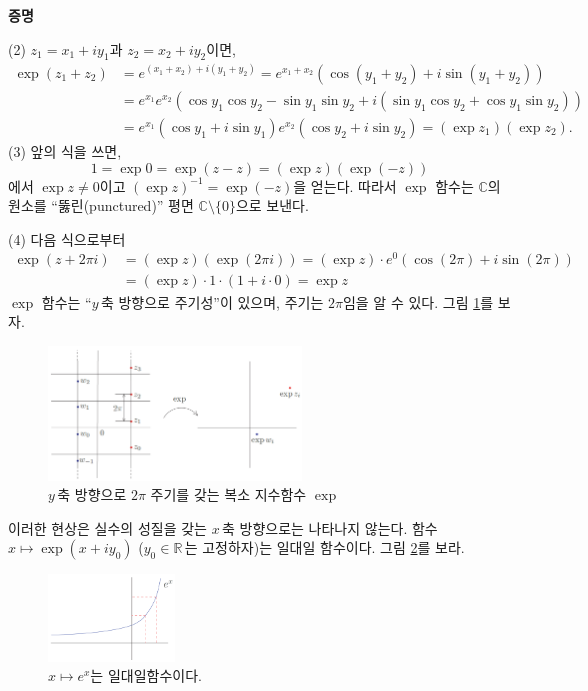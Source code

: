 {\bf 증명}

\noindent
(2)  $z_1 = x_1 + iy_1$과 $z_2 = x_2 + iy_2$이면,
\begin{align*}
\exp(z_1+z_2)
&= e^{(x_1+x_2) + i(y_1+y_2)} = e^{x_1+x_2}
\left( \cos(y_1+y_2) + i\sin(y_1+y_2) \right) \\
&= e^{x_1}e^{x_2} \left( \cos y_1 \cos y_2 - \sin y_1\sin y_2
+ i(\sin y_1\cos y_2 + \cos y_1\sin y_2) \right) \\
&= e^{x_1} (\cos y_1 + i\sin y_1)  e^{x_2} (\cos y_2 + i\sin y_2)  
= (\exp z_1)(\exp z_2).
\end{align*}
(3) 앞의 식을 쓰면,
$$
1  = \exp 0 = \exp (z-z) = (\exp z)(\exp (-z))
$$
에서 $\exp z \ne 0$이고 $(\exp z)^{-1} = \exp(-z)$을 얻는다.
따라서 $\exp$ 함수는 $\mathbb C$의 원소를 
``뚫린(punctured)'' 평면 $\mathbb C\setminus \{0\}$으로 보낸다.

\noindent
(4) 다음 식으로부터
\begin{align*}
\exp(z+2\pi i)
&= (\exp z)(\exp (2\pi i)) = (\exp z)\cdot e^0(\cos(2\pi) + i\sin(2\pi)) \\
&= (\exp z)\cdot 1\cdot(1+i\cdot 0) = \exp z
\end{align*}
$\exp$ 함수는 ``$y\,$축 방향으로 주기성''이 있으며, 주기는 $2\pi$임을 알 수 있다.
그림 \ref{fig-1-14}를 보자.

\begin{figure}[!h]
\begin{center}
\includegraphics[width=0.6\textwidth]{./SaltChapter/figs/fig-1-14}
\end{center}
\caption{$y\,$축 방향으로 $2\pi$ 주기를 갖는 복소 지수함수 $\exp$}
\label{fig-1-14}
\end{figure}

이러한 현상은 실수의 성질을 갖는 $x\,$축 방향으로는 나타나지 않는다.
함수 $x\mapsto \exp(x+iy_0)$ ($y_0\in \mathbb R\,$는 고정하자)는 일대일 함수이다.
그림 \ref{fig-1-15}를 보라.

\begin{figure}[!h]
\begin{center}
\includegraphics[width=0.3\textwidth]{./SaltChapter/figs/fig-1-15}
\end{center}
\caption{$x\mapsto e^x$는 일대일함수이다.}
\label{fig-1-15}
\end{figure}

